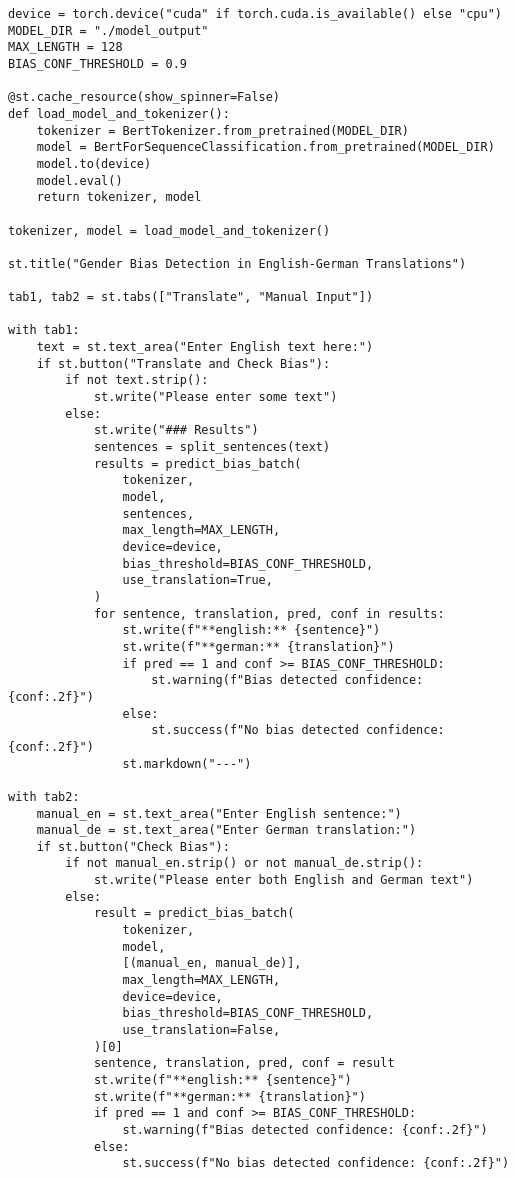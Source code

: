 \begin{appendices}
\begin{lstlisting}
device = torch.device("cuda" if torch.cuda.is_available() else "cpu")
MODEL_DIR = "./model_output"
MAX_LENGTH = 128
BIAS_CONF_THRESHOLD = 0.9

@st.cache_resource(show_spinner=False)
def load_model_and_tokenizer():
    tokenizer = BertTokenizer.from_pretrained(MODEL_DIR)
    model = BertForSequenceClassification.from_pretrained(MODEL_DIR)
    model.to(device)
    model.eval()
    return tokenizer, model

tokenizer, model = load_model_and_tokenizer()

st.title("Gender Bias Detection in English-German Translations")

tab1, tab2 = st.tabs(["Translate", "Manual Input"])

with tab1:
    text = st.text_area("Enter English text here:")
    if st.button("Translate and Check Bias"):
        if not text.strip():
            st.write("Please enter some text")
        else:
            st.write("### Results")
            sentences = split_sentences(text)
            results = predict_bias_batch(
                tokenizer,
                model,
                sentences,
                max_length=MAX_LENGTH,
                device=device,
                bias_threshold=BIAS_CONF_THRESHOLD,
                use_translation=True,
            )
            for sentence, translation, pred, conf in results:
                st.write(f"**english:** {sentence}")
                st.write(f"**german:** {translation}")
                if pred == 1 and conf >= BIAS_CONF_THRESHOLD:
                    st.warning(f"Bias detected confidence: {conf:.2f}")
                else:
                    st.success(f"No bias detected confidence: {conf:.2f}")
                st.markdown("---")

with tab2:
    manual_en = st.text_area("Enter English sentence:")
    manual_de = st.text_area("Enter German translation:")
    if st.button("Check Bias"):
        if not manual_en.strip() or not manual_de.strip():
            st.write("Please enter both English and German text")
        else:
            result = predict_bias_batch(
                tokenizer,
                model,
                [(manual_en, manual_de)],
                max_length=MAX_LENGTH,
                device=device,
                bias_threshold=BIAS_CONF_THRESHOLD,
                use_translation=False,
            )[0]
            sentence, translation, pred, conf = result
            st.write(f"**english:** {sentence}")
            st.write(f"**german:** {translation}")
            if pred == 1 and conf >= BIAS_CONF_THRESHOLD:
                st.warning(f"Bias detected confidence: {conf:.2f}")
            else:
                st.success(f"No bias detected confidence: {conf:.2f}")
\end{lstlisting}

\end{appendices}
